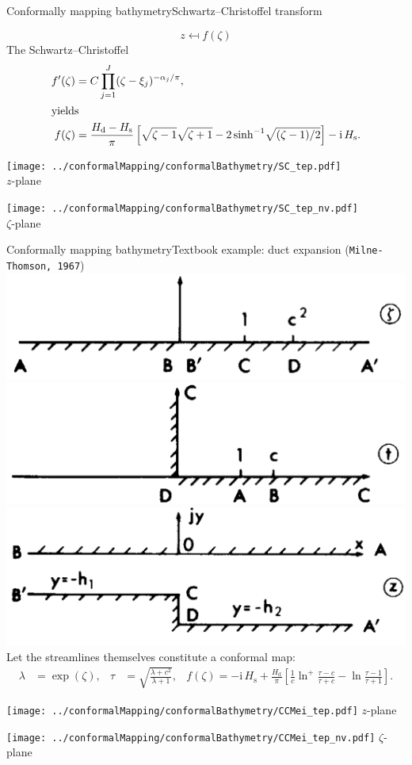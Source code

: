 \documentclass{sintefbeamer}
\newcommand{\mr}{\mathrm}
\newcommand{\ii}{\mr{i}\,}
\renewcommand{\_}[1]{_\mr{#1}}
\newcommand{\zmap}{f}
\newcommand{\z}{z}
\newcommand{\zz}{\zeta}
\newcommand{\xx}{\xi}
\begin{document}


\begin{frame}{Conformally mapping bathymetry}{Schwartz--Christoffel transform}
	\vspace{-10mm}
	
	\[	\z\mapsfrom\zmap(\zz) \]
	\footnotesize
	 The Schwartz--Christoffel
	\begin{align*}
		\zmap'(\zz) &= C \prod_{j=1}^J (\zz-\xx_j)^{-\alpha_j/\pi},\\
		\intertext{yields}
		\zmap(\zz) &= \frac {H\_d-H\_s}\pi \left[  \sqrt{\zz-1}\sqrt{\zz+1} - 2\sinh^{-1}\! \sqrt{(\zz-1)/2} \right] - \ii H\_s.
	\end{align*}
\small
	\begin{center}
		\parbox[b]{.4\columnwidth}{\centering\texttt{[image: ../conformalMapping/conformalBathymetry/SC\_step.pdf]}\\$\z$-plane}%
		\qquad
		\parbox[b]{.4\columnwidth}{\centering\texttt{[image: ../conformalMapping/conformalBathymetry/SC\_step\_inv.pdf]}\\$\zz$-plane}%
\end{center}
\end{frame}

\begin{frame}{Conformally mapping bathymetry}{Textbook example: duct expansion (\texttt{Milne-Thomson, 1967})}
	\vspace{-5mm}
\includegraphics[width=.33\textwidth]{./CCMei1.PNG}%
\includegraphics[width=.33\textwidth]{./CCMei2.PNG}%
\includegraphics[width=.33\textwidth]{./CCMei3.PNG}\\
	\vspace{3mm}
Let the streamlines themselves constitute a conformal map:
\small
\begin{align*}
	\lambda &= \exp(\zz),&
	\tau &= \sqrt{\frac{\lambda+c^2}{\lambda+1} },&
	f(\zz) = -\ii H\_s +\frac{H\_d}{\pi}\left[\frac1c \ln^+\frac{\tau-c}{\tau+c} - \ln\frac{\tau-1}{\tau+1}\right].
\end{align*}%
\begin{center}
	\parbox[b]{.4\framewidth}{\centering
		\texttt{[image: ../conformalMapping/conformalBathymetry/CCMei\_step.pdf]}
		$\z$-plane
	}
	\qquad
	\parbox[b]{.4\framewidth}{\centering
		\texttt{[image: ../conformalMapping/conformalBathymetry/CCMei\_step\_inv.pdf]}
		$\zz$-plane
	}  
\end{center}
\end{frame}
\end{document}
